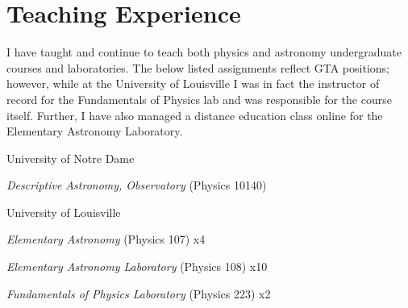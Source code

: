 
\section*{Teaching Experience}

\noindent
I have taught and continue to teach both physics and astronomy undergraduate courses
and laboratories. The below listed assignments reflect GTA positions; however, while
at the University of Louisville I was in fact the instructor of record for the
Fundamentals of Physics lab and was responsible for the course itself. Further, I
have also managed a distance education class online for the Elementary Astronomy
Laboratory.

\TeachingPosition
{
	University of Notre Dame
}
{
	\item \textit{Descriptive Astronomy, Observatory} (Physics 10140)
}

\TeachingPosition
{
	University of Louisville
}
{
	\item \textit{Elementary Astronomy} (Physics 107) x4
	\item \textit{Elementary Astronomy Laboratory} (Physics 108) x10
	\item \textit{Fundamentals of Physics Laboratory} (Physics 223) x2
}

\bigskip
